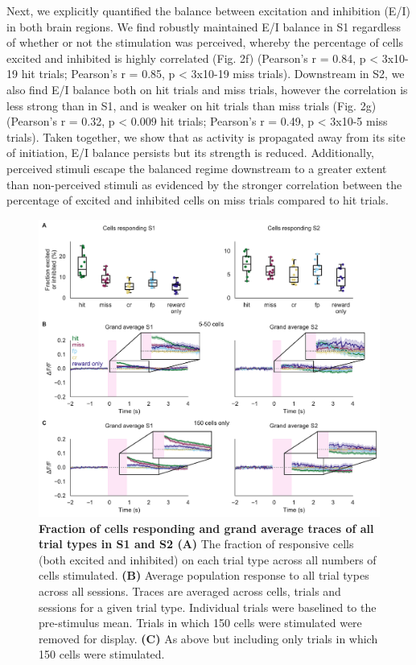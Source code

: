 Next, we explicitly quantified the balance between excitation and inhibition (E/I) in both brain regions. We find robustly maintained E/I balance in S1 regardless of whether or not the stimulation was perceived, whereby the percentage of cells excited and inhibited is highly correlated (Fig. 2f) (Pearson’s r = 0.84, p < 3x10-19 hit trials; Pearson’s r = 0.85, p < 3x10-19 miss trials). Downstream in S2, we also find E/I balance both on hit trials and miss trials, however the correlation is less strong than in S1, and is weaker on hit trials than miss trials (Fig. 2g) (Pearson’s r = 0.32, p < 0.009 hit trials; Pearson’s r = 0.49, p < 3x10-5 miss trials). Taken together, we show that as activity is propagated away from its site of initiation, E/I balance persists but its strength is reduced. Additionally, perceived stimuli escape the balanced regime downstream to a greater extent than non-perceived stimuli as evidenced by the stronger correlation between the percentage of excited and inhibited cells on miss trials compared to hit trials. 

\begin{figure}[h]
\includegraphics[scale=0.65]{figures/supplements/Supplementary_Figure1.pdf}
\caption[\textbf{Fraction of cells responding and grand average traces of all trial types in S1 and S2}]{\textbf{ Fraction of cells responding and grand average traces of all trial types in S1 and S2
 (A)} The fraction of responsive cells (both excited and inhibited) on each trial type across all numbers of cells stimulated. \textbf{(B)} Average population response to all trial types across all sessions. Traces are averaged across cells, trials and sessions for a given trial type. Individual trials were baselined to the pre-stimulus mean. Trials in which 150 cells were stimulated were removed for display. \textbf{(C)} As above but including only trials in which 150 cells were stimulated. 
} 
\label{fig:supp1}
\end{figure}


